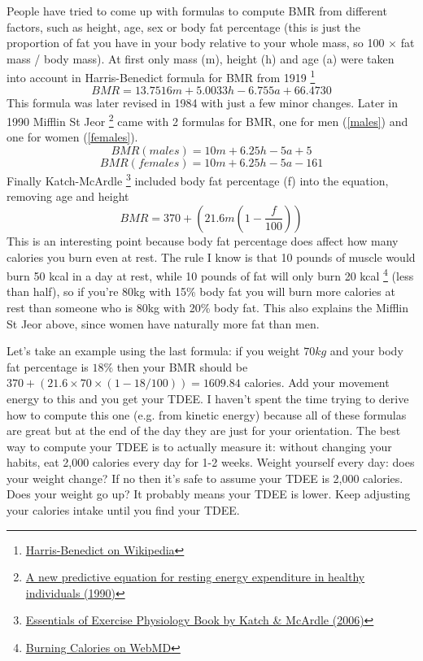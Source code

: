 \documentclass[openany, 12pt]{book}
\begin{document}
	People have tried to come up with formulas to compute BMR from different factors, such as height, age, sex or body fat percentage (this is just
	the proportion of fat you have in your body relative to your whole mass, so 100 $\times$ fat mass / body mass). At first only mass (m), height (h) 
	and age (a) were taken into account in Harris-Benedict formula for BMR from 1919
        \footnote{\href{https://en.wikipedia.org/wiki/Harris\%E2\%80\%93Benedict_equation}{Harris-Benedict on Wikipedia}}
	\begin{equation}
		BMR = 13.7516m + 5.0033h - 6.755a + 66.4730
	\end{equation}
  	This formula was later revised in 1984 with just a few minor changes. Later in 1990 Mifflin St Jeor
        \footnote{\href{https://pubmed.ncbi.nlm.nih.gov/2305711/}{A new predictive equation for resting energy expenditure in healthy individuals (1990)}}
        came with 2 formulas for BMR, one for men (\ref{males}) and one for women (\ref{females}).
	\begin{equation}
		\label{males}
		BMR (males) = 10m + 6.25h - 5a + 5
	\end{equation}
	\begin{equation}
		\label{females}
		BMR (females) = 10m + 6.25h - 5a - 161
	\end{equation}
	Finally Katch-McArdle
        \footnote{\href{https://books.google.co.uk/books/about/Essentials_of_Exercise_Physiology.html?id=L4aZIDbmV3oC}{Essentials of Exercise Physiology Book by Katch \& McArdle (2006)}}
        included body fat percentage (f) into the equation, removing age and height
	\begin{equation}
		BMR = 370 + (21.6m (1 - \frac{f}{100}))
	\end{equation}
	This is an interesting point because body fat percentage does affect how many calories you burn even at rest. The rule I know is that 10 pounds of muscle would burn 50 kcal in a day at rest,
        while 10 pounds of fat will only burn 20 kcal
        \footnote{\href{https://www.webmd.com/diet/obesity/features/8-ways-to-burn-calories-and-fight-fat}{Burning Calories on WebMD}} (less than half),
        so if you're 80kg with 15\% body fat you will burn more calories at rest than someone who is 80kg with 20\% body fat. This also explains the Mifflin St Jeor above, since women have naturally
        more fat than men.
	
	Let's take an example using the last formula: if you weight $70kg$ and your body fat percentage is $18\%$ then your BMR should be $370 + (21.6 \times 70 \times (1 - 18/100)) = 1609.84$ calories.
        Add your movement energy to this and you get your TDEE. I haven't spent the time trying to derive how to
	compute this one (e.g. from kinetic energy) because all of these formulas are great but at the end of the day they are just for your orientation.
	The best way to compute your TDEE is to actually measure it: without changing your habits, eat 2,000 calories every day for 1-2 weeks. Weight
	yourself every day: does your weight change? If no then it's safe to assume your TDEE is 2,000 calories. Does your weight go up? It probably means
	your TDEE is lower. Keep adjusting your calories intake until you find your TDEE. 
	
\end{document}
